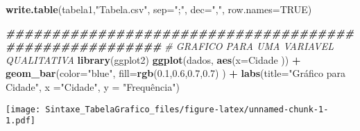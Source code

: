\documentclass[
]{article}
\newenvironment{Shaded}{\begin{snugshade}}{\end{snugshade}}
\newcommand{\AttributeTok}[1]{\textcolor[rgb]{0.13,0.29,0.53}{#1}}
\newcommand{\CommentTok}[1]{\textcolor[rgb]{0.56,0.35,0.01}{\textit{#1}}}
\newcommand{\ConstantTok}[1]{\textcolor[rgb]{0.56,0.35,0.01}{#1}}
\newcommand{\DecValTok}[1]{\textcolor[rgb]{0.00,0.00,0.81}{#1}}
\newcommand{\DocumentationTok}[1]{\textcolor[rgb]{0.56,0.35,0.01}{\textbf{\textit{#1}}}}
\newcommand{\FloatTok}[1]{\textcolor[rgb]{0.00,0.00,0.81}{#1}}
\newcommand{\FunctionTok}[1]{\textcolor[rgb]{0.13,0.29,0.53}{\textbf{#1}}}
\newcommand{\NormalTok}[1]{#1}
\newcommand{\OtherTok}[1]{\textcolor[rgb]{0.56,0.35,0.01}{#1}}
\newcommand{\SpecialCharTok}[1]{\textcolor[rgb]{0.81,0.36,0.00}{\textbf{#1}}}
\newcommand{\StringTok}[1]{\textcolor[rgb]{0.31,0.60,0.02}{#1}}
\begin{document}
\begin{Shaded}
\begin{Highlighting}[]
\FunctionTok{write.table}\NormalTok{(tabela1,}\StringTok{"Tabela.csv"}\NormalTok{, }\AttributeTok{sep=}\StringTok{";"}\NormalTok{, }\AttributeTok{dec=}\StringTok{","}\NormalTok{, }\AttributeTok{row.names=}\ConstantTok{TRUE}\NormalTok{)}


\DocumentationTok{\#\#\#\#\#\#\#\#\#\#\#\#\#\#\#\#\#\#\#\#\#\#\#\#\#\#\#\#\#\#\#\#\#\#\#\#\#\#\#\#\#\#\#\#\#\#\#\#\#\#\#\#\#\#\#}
\CommentTok{\# GRAFICO PARA UMA VARIAVEL QUALITATIVA}
\FunctionTok{library}\NormalTok{(ggplot2)}
\FunctionTok{ggplot}\NormalTok{(dados, }\FunctionTok{aes}\NormalTok{(}\AttributeTok{x=}\NormalTok{Cidade )) }\SpecialCharTok{+}
  \FunctionTok{geom\_bar}\NormalTok{(}\AttributeTok{color=}\StringTok{"blue"}\NormalTok{, }\AttributeTok{fill=}\FunctionTok{rgb}\NormalTok{(}\FloatTok{0.1}\NormalTok{,}\FloatTok{0.6}\NormalTok{,}\FloatTok{0.7}\NormalTok{,}\FloatTok{0.7}\NormalTok{) ) }\SpecialCharTok{+}
  \FunctionTok{labs}\NormalTok{(}\AttributeTok{title=}\StringTok{"Gráfico para Cidade"}\NormalTok{,}
       \AttributeTok{x =}\StringTok{"Cidade"}\NormalTok{, }\AttributeTok{y =} \StringTok{"Frequência"}\NormalTok{)}
\end{Highlighting}
\end{Shaded}

\texttt{[image: Sintaxe\_TabelaGrafico\_files/figure-latex/unnamed-chunk-1-1.pdf]}

\begin{Shaded}
\end{Shaded}
\end{document}
